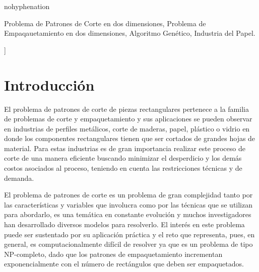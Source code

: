 \documentclass[a4paper,10pt,twocolumn]{article}
\begin{document}
\begin{hyphenrules}{nohyphenation}
\begin{enabstract}
\end{enabstract}

\begin{keywords}
	Problema de Patrones de Corte en dos dimensiones,
	Problema de Empaqauetamiento en dos dimensiones,
	Algoritmo Genético,
	Industria del Papel.
\end{keywords}



\vspace{0.8cm}
]



\section{Introducción}\label{sec:intro}
El problema de patrones de corte de piezas rectangulares pertenece a
la familia de problemas de corte y empaquetamiento y sus
aplicaciones se pueden observar en industrias de perfiles
metálicos, corte de maderas, papel, plástico o vidrio en
donde los componentes rectangulares tienen que ser
cortados de grandes hojas de material. Para estas industrias es de gran importancia realizar
este proceso de corte de una manera eficiente buscando
minimizar el desperdicio y los demás costos asociados
al proceso, teniendo en cuenta las restricciones técnicas
y de demanda. 



El problema de patrones de corte es un problema de gran
complejidad tanto por las características y variables
que involucra como por las técnicas que se utilizan
para abordarlo, es una temática en constante evolución
y muchos investigadores han desarrollado diversos
modelos para resolverlo. El interés en este problema
puede ser sustentado por su aplicación práctica y el
reto que representa, pues, en general,
es computacionalmente difícil de resolver ya que es un
problema de tipo NP-completo, dado que los patrones de
empaquetamiento incrementan exponencialmente con el
número de rectángulos que deben ser empaquetados. 
 

\end{hyphenrules}
\end{document}
